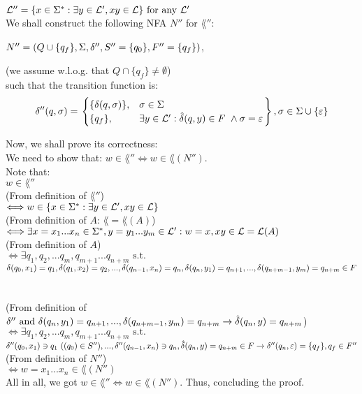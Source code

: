 $\mathcal{L}''=\{x \in \Sigma^* : \exists y \in \mathcal{L}', xy \in \mathcal{L}\} \text{ for any } \mathcal{L}'$
\\

We shall construct the following NFA $N''$ for $\lang''$:

$N''=(Q \cup \{q_f\}, \Sigma, \delta'', S''=\{q_0\}, F''=\{q_f\})$,

(we assume w.l.o.g. that $Q \cap \{q_f\} \neq \emptyset$) \\
such that the transition function is: \\
\[
    \delta''(q,\sigma) = \left.
    \begin{cases}
        \{\delta(q, \sigma)\} , & \sigma \in \Sigma                                                      \\
        \{q_f\},          & \exists y \in \mathcal{L}' : \hat{\delta}(q, y) \in F  \ \wedge \sigma=\varepsilon \\
    \end{cases}
    \right\} , \sigma \in \Sigma \cup \{\varepsilon\}
\]

Now, we shall prove its correctness: \\
We need to show that: $w \in \lang'' \Longleftrightarrow  w \in \lang(N'')$. \\
Note that: \\
$w \in \lang''$\\

(From definition of $\lang''$) \\
$\Longleftrightarrow w \in \{x \in \Sigma^* : \exists y \in \mathcal{L}', xy \in \mathcal{L}\}$ \\

(From definition of $A$: $\lang = \lang(A)$) \\
$\Longleftrightarrow \exists x=x_1...x_n \in \Sigma^*, y=y_1...y_m \in \mathcal{L}': w=x,  xy \in \mathcal{L} = \mathcal{L}(A)$\\

(From definition of $A$) \\
$\Longleftrightarrow \exists q_1,q_2,...q_m, q_{m+1}...q_{n+m} \text{ s.t. } $\\
$
    \delta(q_0,x_1)=q_1, \delta(q_1,x_2)=q_2, ..., \\
    \delta(q_{n-1},x_n)=q_n, \delta(q_n,y_1)=q_{n+1},...,\\
    \delta(q_{n+m-1},y_{m})=q_{n+m} \in F
$ \\ \\ \\

(From definition of $\delta'' \text{ and }
    \delta(q_n,y_1)=q_{n+1},...,\delta(q_{n+m-1},y_{m})=q_{n+m} \rightarrow \hat{\delta}(q_n, y)=q_{n+m}$) \\
$\Longleftrightarrow \exists q_1,q_2,...q_m, q_{m+1}...q_{n+m} \text{ s.t. } $\\
$
    \delta''(q_0,x_1) \ni q_1  \text{ } ((q_0) \in S''), ..., \\
    \delta''(q_{n-1},x_n) \ni q_n, \\
    \hat{\delta}(q_n, y)=q_{n+m} \in F \rightarrow \delta''(q_n,\varepsilon)=\{q_f\}, q_f \in F''
$ \\

(From definition of $N''$) \\
$\Longleftrightarrow w=x_1...x_n \in \lang(N'')$ \\

All in all, we got $w \in \lang'' \Longleftrightarrow  w \in \lang(N'')$. Thus, concluding the proof. \\

